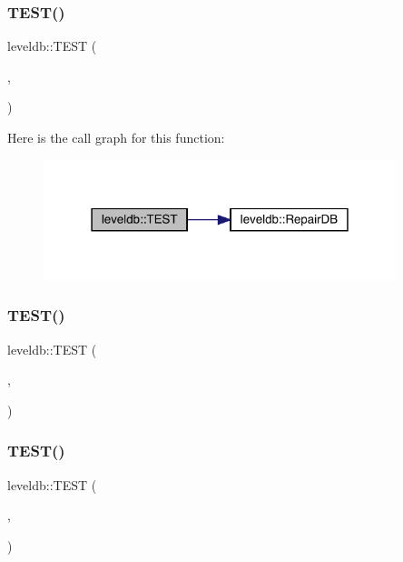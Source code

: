 \subsubsection{\texorpdfstring{TEST()}{TEST()}\hspace{0.1cm}{\footnotesize\ttfamily [33/102]}}
{\footnotesize\ttfamily leveldb\+::\+T\+E\+ST (\begin{DoxyParamCaption}\item[{\mbox{\hyperlink{classleveldb_1_1_corruption_test}{Corruption\+Test}}}]{,  }\item[{Missing\+Descriptor}]{ }\end{DoxyParamCaption})}

Here is the call graph for this function\+:
\nopagebreak
\begin{figure}[H]
\begin{center}
\leavevmode
\includegraphics[width=291pt]{namespaceleveldb_a6214e0d0ebfaf716601f7a9571aa09ca_cgraph}
\end{center}
\end{figure}
\mbox{\label{namespaceleveldb_acc1b0ed2e8e9e4e6b930a1727d9fe0f8}} 
\subsubsection{\texorpdfstring{TEST()}{TEST()}\hspace{0.1cm}{\footnotesize\ttfamily [34/102]}}
{\footnotesize\ttfamily leveldb\+::\+T\+E\+ST (\begin{DoxyParamCaption}\item[{\mbox{\hyperlink{classleveldb_1_1_corruption_test}{Corruption\+Test}}}]{,  }\item[{Sequence\+Number\+Recovery}]{ }\end{DoxyParamCaption})}

\mbox{\label{namespaceleveldb_ae047e1c2f2021c0aaa36b4efeff1520f}} 
\subsubsection{\texorpdfstring{TEST()}{TEST()}\hspace{0.1cm}{\footnotesize\ttfamily [35/102]}}
{\footnotesize\ttfamily leveldb\+::\+T\+E\+ST (\begin{DoxyParamCaption}\item[{\mbox{\hyperlink{classleveldb_1_1_recovery_test}{Recovery\+Test}}}]{,  }\item[{Multiple\+Log\+Files}]{ }\end{DoxyParamCaption})}

